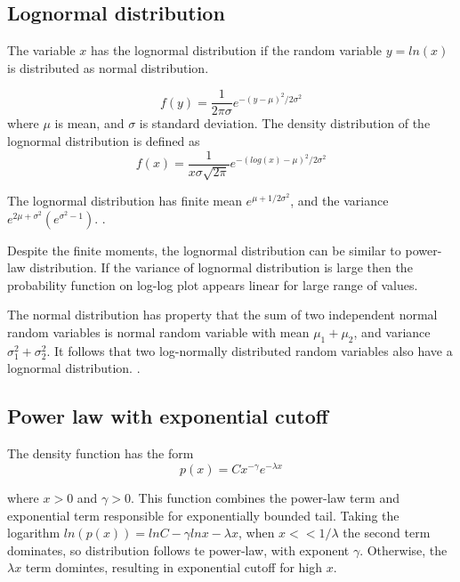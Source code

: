 \subsection{Lognormal distribution}

The variable $x$ has the lognormal distribution if the random variable $y=ln(x)$ is distributed as normal distribution. 

\begin{equation}
f(y) = \frac{1}{2\pi\sigma}e^{-(y-\mu)^2/2\sigma^2}
\end{equation}
where $\mu$ is mean, and $\sigma$ is standard deviation. The density distribution of the lognormal distribution is defined as
\begin{equation}
f(x) = \frac{1}{x \sigma \sqrt{2\pi}}e^{-(log(x)-\mu)^2 /2\sigma^2} 
\end{equation}

The lognormal distribution has finite mean $e^{\mu+1/2\sigma^2}$, and the variance $e^{2\mu+\sigma^2}(e^{\sigma^2 -1})$.  \cite{mitzenmacher2004brief}.

Despite the finite moments, the lognormal distribution can be similar to power-law distribution. If the variance of lognormal distribution is large then the probability function on log-log plot appears linear for large range of values. 

The normal distribution has property that the sum of two independent normal random variables is normal random variable with mean $\mu_1+\mu_2$, and variance $\sigma_1^2+ \sigma_2^2$. It follows that two log-normally distributed random variables also have a lognormal distribution. \cite{mitzenmacher2004brief}. 

\subsection{Power law with exponential cutoff}

The density function has the form
\begin{equation}
p(x) = C x^{-\gamma}e^{-\lambda x}
\end{equation}

where $x>0$ and $\gamma>0$. This function combines the power-law term and exponential term responsible for exponentially bounded tail. Taking the logarithm $ln(p(x)) = lnC - \gamma lnx - \lambda x$, when $x<<1/\lambda$ the second term dominates, so distribution follows te power-law, with exponent $\gamma$. Otherwise, the $\lambda x$ term domintes, resulting in exponential cutoff for high $x$. 

